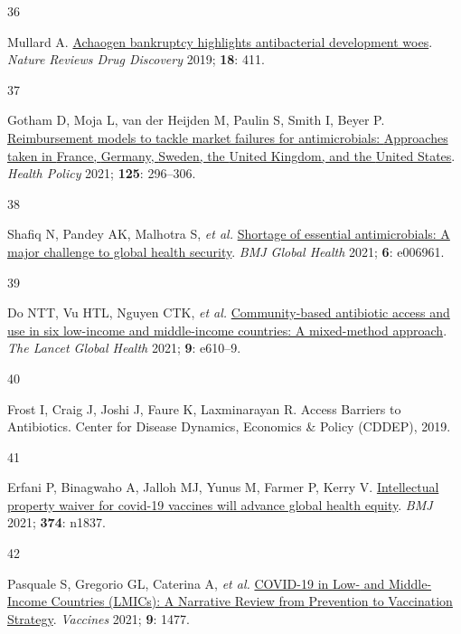 \documentclass[
  11pt,
  paper=a4,
  ,captions=tableheading
]{scrartcl}
\newlength{\cslhangindent}
\newlength{\csllabelwidth}
\newenvironment{CSLReferences}[2] %
 {%
  \setlength{\parindent}{0pt}
  \ifodd #1 \everypar{\setlength{\hangindent}{\cslhangindent}}\ignorespaces\fi
  \ifnum #2 > 0
  \setlength{\parskip}{#2\baselineskip}
  \fi
 }%
 {}
\newcommand{\CSLLeftMargin}[1]{\parbox[t]{\csllabelwidth}{#1}}
\newcommand{\CSLRightInline}[1]{\parbox[t]{\linewidth - \csllabelwidth}{#1}\break}
\begin{document}
\begin{CSLReferences}{0}{0}
\leavevmode{}%
\CSLLeftMargin{36 }
\CSLRightInline{Mullard A.
\href{https://doi.org/10.1038/d41573-019-00085-w}{Achaogen bankruptcy
highlights antibacterial development woes}. \emph{Nature Reviews Drug
Discovery} 2019; \textbf{18}: 411.}

\leavevmode{}%
\CSLLeftMargin{37 }
\CSLRightInline{Gotham D, Moja L, van der Heijden M, Paulin S, Smith I,
Beyer P.
\href{https://doi.org/10.1016/j.healthpol.2020.11.015}{Reimbursement
models to tackle market failures for antimicrobials: {Approaches} taken
in {France}, {Germany}, {Sweden}, the {United Kingdom}, and the {United
States}}. \emph{Health Policy} 2021; \textbf{125}: 296--306.}

\leavevmode{}%
\CSLLeftMargin{38 }
\CSLRightInline{Shafiq N, Pandey AK, Malhotra S, \emph{et al.}
\href{https://doi.org/10.1136/bmjgh-2021-006961}{Shortage of essential
antimicrobials: A major challenge to global health security}. \emph{BMJ
Global Health} 2021; \textbf{6}: e006961.}

\leavevmode{}%
\CSLLeftMargin{39 }
\CSLRightInline{Do NTT, Vu HTL, Nguyen CTK, \emph{et al.}
\href{https://doi.org/10.1016/S2214-109X(21)00024-3}{Community-based
antibiotic access and use in six low-income and middle-income countries:
A mixed-method approach}. \emph{The Lancet Global Health} 2021;
\textbf{9}: e610--9.}

\leavevmode{}%
\CSLLeftMargin{40 }
\CSLRightInline{Frost I, Craig J, Joshi J, Faure K, Laxminarayan R.
Access {Barriers} to {Antibiotics}. {Center for Disease Dynamics,
Economics \& Policy (CDDEP)}, 2019.}

\leavevmode{}%
\CSLLeftMargin{41 }
\CSLRightInline{Erfani P, Binagwaho A, Jalloh MJ, Yunus M, Farmer P,
Kerry V. \href{https://doi.org/10.1136/bmj.n1837}{Intellectual property
waiver for covid-19 vaccines will advance global health equity}.
\emph{BMJ} 2021; \textbf{374}: n1837.}

\leavevmode{}%
\CSLLeftMargin{42 }
\CSLRightInline{Pasquale S, Gregorio GL, Caterina A, \emph{et al.}
\href{https://doi.org/10.3390/vaccines9121477}{{COVID-19} in {Low-} and
{Middle-Income Countries} ({LMICs}): {A Narrative Review} from
{Prevention} to {Vaccination Strategy}}. \emph{Vaccines} 2021;
\textbf{9}: 1477.}


\end{CSLReferences}
\end{document}
